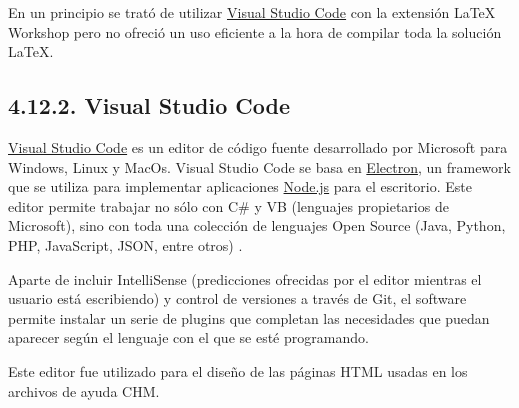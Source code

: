 En un principio se trató de utilizar \href{https://code.visualstudio.com/}{Visual Studio Code} con la extensión LaTeX Workshop pero no ofreció un uso eficiente a la hora de compilar toda la solución \LaTeX.

\subsection{4.12.2. Visual Studio Code}

\href{https://code.visualstudio.com/}{Visual Studio Code} es un editor de código fuente desarrollado por Microsoft para Windows, Linux y MacOs. Visual Studio Code se basa en \href{https://electronjs.org/}{Electron}, un framework que se utiliza para implementar aplicaciones \href{https://nodejs.org/es/}{Node.js} para el escritorio. Este editor permite trabajar no sólo con C\# y VB (lenguajes propietarios de Microsoft), sino con toda una colección de lenguajes Open Source (Java, Python, PHP, JavaScript, JSON, entre otros) \cite{web:vsCode}.

Aparte de incluir IntelliSense (predicciones ofrecidas por el editor mientras el usuario está escribiendo) y control de versiones a través de Git, el software permite instalar un serie de plugins que completan las necesidades que puedan aparecer según el lenguaje con el que se esté programando.

Este editor fue utilizado para el diseño de las páginas HTML usadas en los archivos de ayuda CHM.